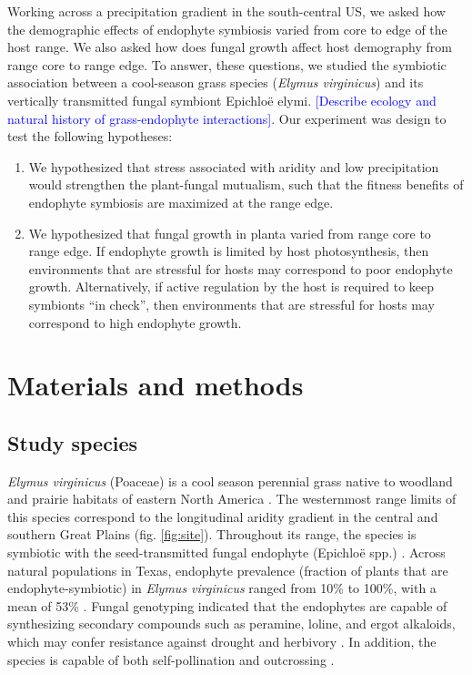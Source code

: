 \documentclass[11pt]{article}
\begin{document}
Working across a precipitation gradient in the south-central US, we asked how the demographic effects of endophyte symbiosis varied from core to edge of the host range.
We also asked how does fungal growth affect host demography from range core to range edge. 
To answer, these questions, we studied the symbiotic association between a cool-season grass species (\emph{Elymus virginicus}) and its vertically transmitted fungal symbiont Epichloë elymi. \textcolor{blue}{[Describe ecology and natural history of grass-endophyte interactions]}.
Our experiment was design to test the following hypotheses:
\begin{enumerate}
\item We hypothesized that stress associated with aridity and low precipitation would strengthen the plant-fungal mutualism, such that the fitness benefits of endophyte symbiosis are maximized at the range edge. 
\item We hypothesized that fungal growth in planta varied from range core to range edge. If endophyte growth is limited by host photosynthesis, then environments that are stressful for hosts may correspond to poor endophyte growth. Alternatively, if active regulation by the host is required to keep symbionts “in check”, then environments that are stressful for hosts may correspond to high endophyte growth.
\end{enumerate}

\section*{Materials and methods}
\subsection*{Study species}
\emph {Elymus virginicus} (Poaceae) is a cool season perennial grass native to woodland and prairie habitats of eastern North America \citep{shaw2011guide}. 
The westernmost range limits of this species correspond to the longitudinal aridity gradient in the central and southern Great Plains (fig. \ref{fig:site}). 
Throughout its range, the species is  symbiotic with the seed-transmitted fungal endophyte (Epichloë spp.) \citep{rudgers2009benefits}. 
Across natural populations in Texas, endophyte prevalence (fraction of plants that are endophyte-symbiotic) in \emph {Elymus virginicus}  ranged from 10\% to 100\%, with a mean of 53\% \citep{sneck2017variation}. 
Fungal genotyping indicated that the endophytes are capable of synthesizing secondary compounds such as peramine, loline, and ergot alkaloids, which may confer resistance against drought and herbivory \citep{beaudry1951seed}.
In addition, the species is capable of both self-pollination and outcrossing \citep{church1958artificial}. 
\end{document}
